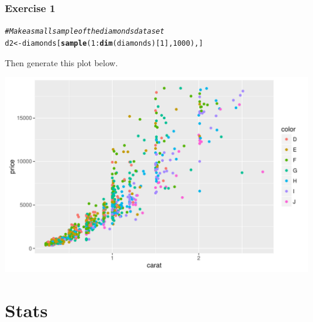 \documentclass{beamer}\usepackage[]{graphicx}\usepackage[]{color}
\makeatletter
\newcommand{\hlnum}[1]{\textcolor[rgb]{0.686,0.059,0.569}{#1}}%
\newcommand{\hlcom}[1]{\textcolor[rgb]{0.678,0.584,0.686}{\textit{#1}}}%
\newcommand{\hlopt}[1]{\textcolor[rgb]{0,0,0}{#1}}%
\newcommand{\hlstd}[1]{\textcolor[rgb]{0.345,0.345,0.345}{#1}}%
\newcommand{\hlkwb}[1]{\textcolor[rgb]{0.69,0.353,0.396}{#1}}%
\newcommand{\hlkwd}[1]{\textcolor[rgb]{0.737,0.353,0.396}{\textbf{#1}}}%
\newenvironment{kframe}{%
 \def\at@end@of@kframe{}%
 \ifinner\ifhmode%
  \def\at@end@of@kframe{\end{minipage}}%
  \begin{minipage}{\columnwidth}%
 \fi\fi%
 \def\FrameCommand##1{\hskip\@totalleftmargin \hskip-\fboxsep
 \colorbox{shadecolor}{##1}\hskip-\fboxsep
     \hskip-\linewidth \hskip-\@totalleftmargin \hskip\columnwidth}%
 \MakeFramed {\advance\hsize-\width
   \@totalleftmargin\z@ \linewidth\hsize
   \@setminipage}}%
 {\par\unskip\endMakeFramed%
 \at@end@of@kframe}
\newenvironment{knitrout}{}{} %
\makeatother
\begin{document}
\begin{frame}[fragile]
\frametitle{Exercise 1}
\begin{knitrout}\footnotesize
{}\color{fgcolor}\begin{kframe}
\begin{alltt}
\hlcom{# Make a small sample of the diamonds dataset}
\hlstd{d2} \hlkwb{<-} \hlstd{diamonds[}\hlkwd{sample}\hlstd{(}\hlnum{1}\hlopt{:}\hlkwd{dim}\hlstd{(diamonds)[}\hlnum{1}\hlstd{],} \hlnum{1000}\hlstd{), ]}
\end{alltt}
\end{kframe}
\end{knitrout}
Then generate this plot below.

\begin{knitrout}\footnotesize
{}\color{fgcolor}

{\centering \includegraphics[width=.75\linewidth]{figure/ex1-1} 

}



\end{knitrout}
\end{frame}


\section*{Stats}
\frame{\sectionpage}

\end{document}
